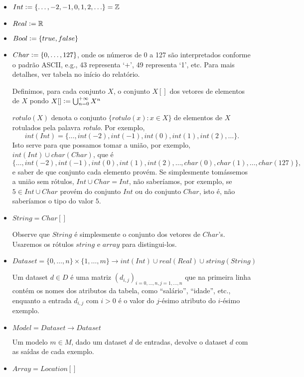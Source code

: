 \documentclass[12pt]{article}
\newcommand{\defeq}{\vcentcolon=}
\begin{document}
\begin{itemize}
\item $Int \defeq \{\ldots, -2, -1, 0, 1, 2, \ldots\} = \mathbb{Z}$

\item $Real \defeq  \mathbb{R}$
\item $Bool \defeq \{true, false\}$
\item $Char \defeq \{0, \ldots, 127\}$, onde os números de 0 a 127 são interpretados conforme o padrão ASCII, e.g., 43 representa `$+$', 49 representa `1', etc. Para mais detalhes, ver tabela no início do relatório.

Definimos, para cada conjunto $X$, o conjunto $X[]$ dos vetores de elementos de $X$ pondo $X[] \defeq \bigcup_{n = 0}^{+\infty} X^n$

$rotulo(X)$ denota o conjunto $\{rotulo(x): x\in X\}$ de elementos de $X$ rotulados pela palavra {\it rotulo}. Por exemplo, $$int(Int) = \{\ldots, int(-2), int(-1), int(0), int(1), int(2), \ldots\}.$$ Isto serve para que possamos tomar a união, por exemplo, $int(Int) \cup char(Char)$, que é 
$$\{\ldots, int(-2), int(-1), int(0),  int(1), int(2), \ldots, char(0), char(1), \ldots, char(127)\},$$
e saber de que conjunto cada elemento provém. Se simplesmente tomássemos a união sem rótulos, $Int \cup Char = Int$, não saberíamos, por exemplo, se $5\in Int \cup Char$ provém do conjunto $Int$ ou do conjunto $Char$, isto é, não saberíamos o tipo do valor $5$.

\item $String = Char[]$

Observe que $String$ é simplesmente o conjunto dos vetores de $Char$'s. Usaremos os rótulos $string$ e $array$ para distingui-los.

\item $Dataset = \{0, \ldots, n\} \times \{1, \ldots, m\} \rightarrow int(Int) \cup real(Real) \cup string(String)$

Um dataset $d\in D$ é uma matriz $(d_{i, j})_{i= 0, \ldots, n, j = 1, \ldots, n}$ que na primeira linha contém os nomes dos atributos da tabela, como ``salário'', ``idade'', etc., enquanto a entrada $d_{i, j}$ com $i > 0$ é o valor do $j$-ésimo atributo do $i$-ésimo exemplo.

\item $Model = Dataset \rightarrow Dataset$

Um modelo $m\in M$, dado um dataset $d$ de entradas, devolve o dataset $d$ com as saídas de cada exemplo.

\item $Array = Location[]$


\end{itemize}
\end{document}
